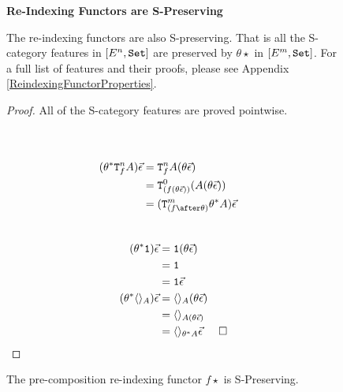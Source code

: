 \begin{figure}
    
    \begin{framed}
        \begin{center}
            \textbf{Re-Indexing Functors are S-Preserving}    
        \end{center}
        
        \begin{theorem}
            The re-indexing functors are also S-preserving. That is all the S-category features in $[E^n, \texttt{Set}]$ are preserved by $\theta\star$ in $[E^m, \texttt{Set}]$. For a full list of features and their proofs, please see Appendix \ref{ReindexingFunctorProperties}.
        \end{theorem}
        
        
        \begin{proof}
            All of the S-category features are proved pointwise.
            \\
            \\
            \begin{minipage}{0.45\linewidth}
            \begin{align*}
                \\ 
                (\theta\star\Tn{f}{A})\ev & = \Tn{f}{A}(\theta\ev) \\
                & = \Tz{(f(\theta\ev))}{(A(\theta\ev))}\\
                & = (\Tm{(f\after\theta)}{\theta\star A})\ev\\ \\
            \end{align*}
            \end{minipage}
            \quad
            \begin{minipage}
                {0.45\linewidth}
            
        \begin{align*}
            (\theta^* \texttt{1})\vec{\epsilon} & = \texttt{1}(\theta\vec{\epsilon})\\
            & = \texttt{1} \\
            & = \texttt{1} \vec{\epsilon}\\
            (\theta^*\langle\rangle_{A})\vec{\epsilon} & = \langle\rangle_{A}(\theta\vec{\epsilon})\\
            & = \langle\rangle_{A(\theta\vec{\epsilon})}\\
            & = \langle\rangle_{\theta^* A}\vec{\epsilon} & \square
        \end{align*}
            \end{minipage}

        \end{proof}
    \end{framed}
    \caption{The pre-composition re-indexing functor $f\star$ is S-Preserving.}
    \label{PrecompositionSClosure}
\end{figure}

